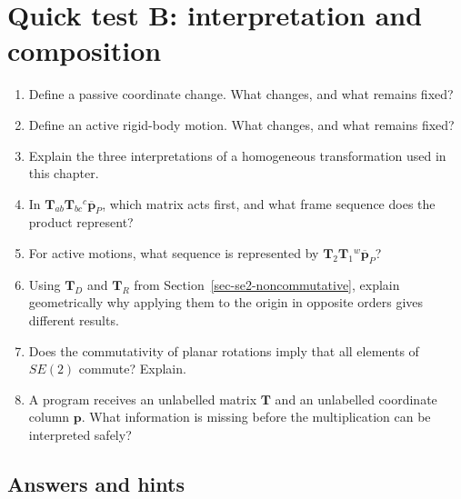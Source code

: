 \documentclass[
  australian,
  12pt,
  letterpaper,
  DIV=11,
  numbers=noendperiod,
  twoside]{scrreprt}
\providecommand{\tightlist}{%
  \setlength{\itemsep}{0pt}\setlength{\parskip}{0pt}}
\begin{document}
\section*{Quick test B: interpretation and
composition}\label{quick-test-b-interpretation-and-composition}


\begin{enumerate}
\def\labelenumi{\arabic{enumi}.}
\tightlist
\item
  Define a passive coordinate change. What changes, and what remains
  fixed?
\item
  Define an active rigid-body motion. What changes, and what remains
  fixed?
\item
  Explain the three interpretations of a homogeneous transformation used
  in this chapter.
\item
  In \(\mathbf T_{ab}\mathbf T_{bc}{}^{c}\overline{\mathbf p}_P\), which
  matrix acts first, and what frame sequence does the product represent?
\item
  For active motions, what sequence is represented by
  \(\mathbf T_2\mathbf T_1{}^{w}\overline{\mathbf p}_P\)?
\item
  Using \(\mathbf T_D\) and \(\mathbf T_R\) from
  Section~\ref{sec-se2-noncommutative}, explain geometrically why
  applying them to the origin in opposite orders gives different
  results.
\item
  Does the commutativity of planar rotations imply that all elements of
  \(SE(2)\) commute? Explain.
\item
  A program receives an unlabelled matrix \(\mathbf T\) and an
  unlabelled coordinate column \(\mathbf p\). What information is
  missing before the multiplication can be interpreted safely?
\end{enumerate}

\subsection*{Answers and hints}\label{answers-and-hints-11}
\end{document}
